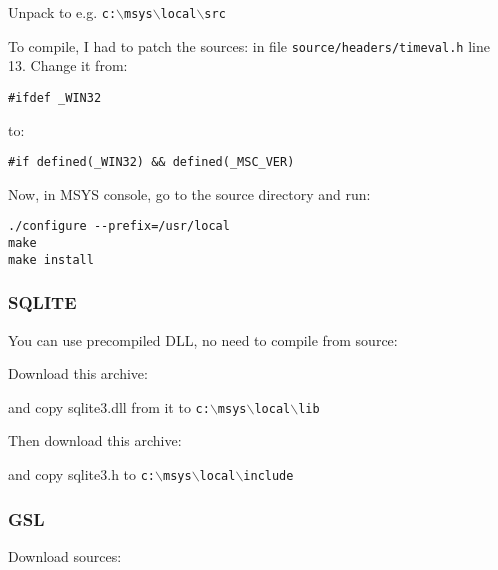 Unpack to e.g. \texttt{c:$\backslash$msys$\backslash$local$\backslash$src}

To compile, I had to patch the sources: in file \texttt{source/headers/timeval.h} line 13.
Change it from:

\begin{verbatim}
#ifdef _WIN32
\end{verbatim}
to:

\begin{verbatim}
#if defined(_WIN32) && defined(_MSC_VER)
\end{verbatim}

Now, in MSYS console, go to the source directory and run:

\begin{verbatim}
./configure --prefix=/usr/local
make
make install
\end{verbatim}

\subsubsection{SQLITE}
You can use precompiled DLL, no need to compile from source:

Download this archive:

	\begin{quotation}
	\end{quotation}

and copy sqlite3.dll from it to \texttt{c:$\backslash$msys$\backslash$local$\backslash$lib}

Then download this archive:

	\begin{quotation}
	\end{quotation}

and copy sqlite3.h to \texttt{c:$\backslash$msys$\backslash$local$\backslash$include}

\subsubsection{GSL}
Download sources:

	\begin{quotation}
	\end{quotation}

